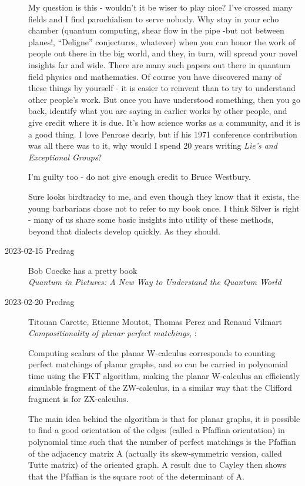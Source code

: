 \begin{description}
My question is this - wouldn't it be wiser to play nice? I've crossed many
fields and I find parochialism to serve nobody. Why stay in your echo chamber
(quantum computing, shear flow in the pipe -but not between planes!,
``Deligne'' conjectures, whatever) when you can honor the work of people out
there in the big world, and they, in turn, will spread your novel insights far
and wide. There are many such papers out there in quantum field physics and
mathematics. Of course you have discovered many of these things by yourself -
it is easier to reinvent than to try to understand other people's work. But
once you have understood something, then you go back, identify what you are
saying in earlier works by other people, and give credit where it is due. It's
how science works as a community, and it is a good thing. I love Penrose dearly,
but if his 1971 conference contribution was all there was to
it, why would I spend 20 years writing {\em Lie's and Exceptional Groups}?

I'm guilty too - do not give enough credit to Bruce Westbury.

Sure looks birdtracky to me, and even though they know that it exists, the
young barbarians chose not to refer to my book once. I think
Silver is right - many of us share some basic insights into
utility of these methods, beyond that dialects develop quickly. As they should.

   \item[2023-02-15 Predrag]
Bob Coecke has a pretty book\\
{\em Quantum in Pictures: A New Way to Understand the Quantum World}

   \item[2023-02-20 Predrag]
Titouan Carette, Etienne Moutot, Thomas Perez and Renaud Vilmart
{\em Compositionality of planar perfect matchings},
:

Computing scalars of the planar W-calculus corresponds to counting perfect
matchings of planar graphs, and so can be carried in polynomial time using
the FKT algorithm, making the planar W-calculus an efficiently simulable
fragment of the ZW-calculus, in a similar way that the Clifford fragment is
for ZX-calculus.

The main idea behind the
algorithm is that for planar graphs, it is possible to find a good orientation of the edges
(called a Pfaffian orientation) in polynomial time such that the number of perfect matchings
is the Pfaffian of the adjacency matrix A (actually its skew-symmetric version, called Tutte
matrix) of the oriented graph. A result due to Cayley then shows that the Pfaffian is the
square root of the determinant of A.


\end{description}

